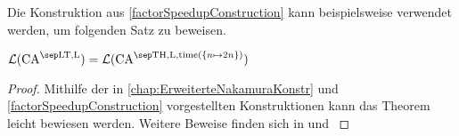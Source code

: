 Die Konstruktion aus \cref{factorSpeedupConstruction} kann beispielsweise verwendet werden, um folgenden Satz zu beweisen.

\begin{theorem}
    \label{linSpeedup}
    $\CAL{\CALT, \CALeft} = \CAL{\CAT, \CALeft, \mathrm{time}(\finset{ n \mapsto 2n }) }$
\end{theorem}
\begin{proof}
    Mithilfe der in \cref{chap:ErweiterteNakamuraKonstr} und \cref{factorSpeedupConstruction} vorgestellten Konstruktionen kann das Theorem leicht bewiesen werden.
    Weitere Beweise finden sich in \cite{MAZOYER199259} und \cite{IBARRA1988225}
\end{proof}

